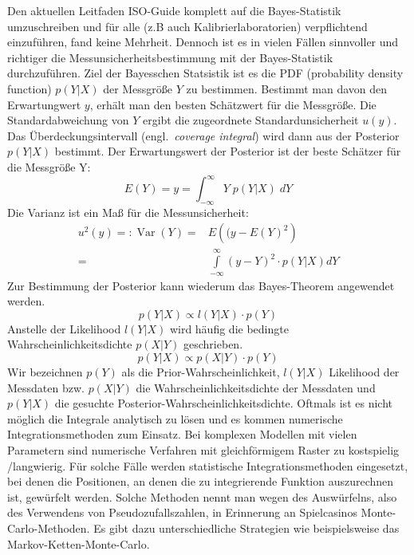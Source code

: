 Den aktuellen Leitfaden ISO-Guide komplett auf die Bayes-Statistik umzuschreiben und für alle (z.B auch Kalibrierlaboratorien) verpflichtend einzuführen, fand keine Mehrheit.  
Dennoch ist es in vielen Fällen sinnvoller und richtiger die 
Messunsicherheitsbestimmung mit der Bayes-Statistik durchzuführen. Ziel der Bayesschen Statsistik ist es die PDF (probability density function) $p(Y|X)$ der Messgröße $Y$ 
zu bestimmen. Bestimmt man davon den Erwartungwert $y$, erhält man den besten Schätzwert für die Messgröße. Die Standardabweichung von $Y$ ergibt die 
zugeordnete Standardunsicherheit $u(y)$. Das Überdeckungsintervall (engl.\ \textsl{coverage integral}) wird dann aus der Posterior $p(Y|X)$ bestimmt.
Der Erwartungswert der Posterior ist der beste Schätzer für die Messgröße Y: 
\[
E(Y) = y = \int_{-\infty}^{\infty} Y \; p(Y|X) \; dY
\]
Die Varianz ist ein Maß für die Messunsicherheit: 
\begin{align}
u^2(y) =: \operatorname{Var}(Y) =& E \left( (y -E(Y)^2\right) \\[2ex]
 =&  \int\limits_{-\infty}^{\infty} (y-Y)^2 \cdot p(Y|X) dY 
\end{align}
Zur Bestimmung der Posterior kann wiederum das Bayes-Theorem angewendet werden.
\begin{equation}
p(Y|X) \propto l(Y|X) \cdot p(Y)
\end{equation}
Anstelle der Likelihood $l(Y|X)$ wird häufig die bedingte Wahrscheinlichkeitsdichte 
$p(X|Y)$ geschrieben. 
\[
p(Y|X) \propto p(X|Y) \cdot p(Y)
\]
Wir bezeichnen $p(Y)$ als die Prior-Wahrscheinlichkeit, 
$l(Y|X)$ Likelihood der Messdaten bzw. $p(X|Y)$ die Wahrscheinlichkeitsdichte 
der Messdaten und $p(Y|X)$ die gesuchte Posterior-Wahrscheinlichkeitsdichte. 
Oftmals ist es nicht möglich die Integrale analytisch zu lösen und es kommen 
numerische Integrationsmethoden zum Einsatz. Bei komplexen Modellen mit vielen
Parametern sind numerische Verfahren mit gleichförmigem Raster zu kostspielig /langwierig.  Für solche Fälle werden statistische Integrationsmethoden eingesetzt, bei denen die Positionen, an denen die zu integrierende Funktion auszurechnen ist, gewürfelt werden. Solche Methoden nennt man wegen des Auswürfelns, also des Verwendens von Pseudozufallszahlen, in Erinnerung an Spielcasinos Monte-Carlo-Methoden. Es gibt dazu unterschiedliche Strategien wie beispielsweise das Markov-Ketten-Monte-Carlo.


